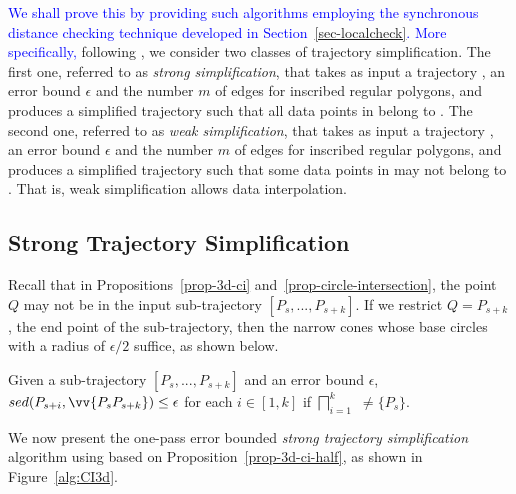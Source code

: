\textcolor{blue}{We shall prove this by providing such algorithms employing the synchronous distance checking technique developed in Section~\ref{sec-localcheck}.}
%
\textcolor{blue}{More specifically,} following \cite{Trajcevski:DDR,Lin:Operb}, we consider two classes of trajectory simplification.
The first one, referred to as \emph{strong simplification}, that takes as input a trajectory , an error bound $\epsilon$ and the number $m$ of edges for inscribed regular polygons, and produces a simplified trajectory  such that all data points in  belong to .
The second one, referred to as \emph{weak simplification}, that takes as input a trajectory , an error bound $\epsilon$ and the number $m$ of edges for inscribed regular polygons, and produces a simplified trajectory  such that some data points in  may not belong to . That is, weak simplification allows data interpolation.


\subsection{Strong Trajectory Simplification}




Recall that in Propositions~\ref{prop-3d-ci} and~\ref{prop-circle-intersection}, the point $Q$ may not be in the input sub-trajectory $[P_s,...,P_{s+k}]$.
If we restrict $Q=P_{s+k}$, the end point of the sub-trajectory, then the narrow cones whose base circles with a radius of $\epsilon/2$ suffice, as shown below.

\begin{prop}
\label{prop-3d-ci-half}
Given a sub-trajectory $[P_s,...,P_{s+k}]$ and an error bound $\epsilon$, $sed(P_{s+i}, \vv{P_sP_{s+k}})\le \epsilon$ for each $i \in [1,k]$ if  $\bigsqcap_{i=1}^{k}$ $\ne \{P_s\}$.
\end{prop}



 We now present the  one-pass error bounded {\em strong trajectory simplification} algorithm using \sed based on Proposition~\ref{prop-3d-ci-half}, as shown in Figure~\ref{alg:CI3d}.


